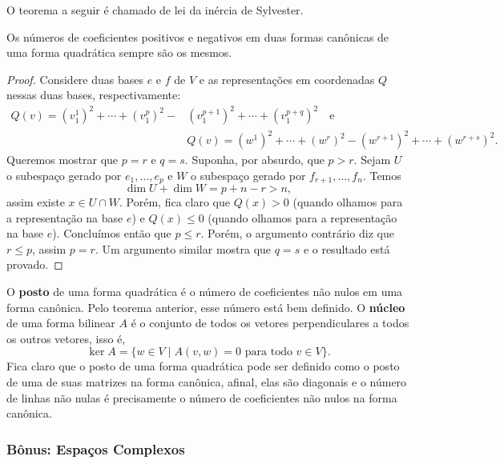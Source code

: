 O teorema a seguir é chamado de lei da inércia de Sylvester.

\begin{theorem}
    Os números de coeficientes positivos e negativos em duas formas canônicas de uma forma quadrática sempre são os mesmos.
\end{theorem}
\begin{proof}
    Considere duas bases $e$ e $f$ de $V$ e as representações em coordenadas $Q$ nessas duas bases, respectivamente: \begin{equation}
        \begin{split}
            Q(v) = (v^1_1)^2 + \cdots + (v^p_1)^2 - &(v^{p+1}_1)^2 + \cdots + (v^{p + q}_1)^2 \quad \text{e} \\ &Q(v) = (w^1)^2 + \cdots + (w^r)^2 - (w^{r+1})^2 + \cdots + (w^{r + s})^2.
        \end{split}
    \end{equation} Queremos mostrar que $p = r$ e $q = s$. Suponha, por absurdo, que $p > r$. Sejam $U$ o subespaço gerado por $e_1, \dots, e_p$ e $W$ o subespaço gerado por $f_{r + 1}, \dots, f_n$. Temos \begin{equation}
        \dim U + \dim W = p + n - r > n,
    \end{equation} assim existe $x \in U \cap W$. Porém, fica claro que $Q(x) > 0$ (quando olhamos para a representação na base $e$) e $Q(x) \leq 0$ (quando olhamos para a representação na base $e$). Concluímos então que $p \leq r$. Porém, o argumento contrário diz que $r \leq p$, assim $p = r$. Um argumento similar mostra que $q = s$ e o resultado está provado.
\end{proof}

O \textbf{posto} de uma forma quadrática é o número de coeficientes não nulos em uma forma canônica. Pelo teorema anterior, esse número está bem definido. O \textbf{núcleo} de uma forma bilinear $A$ é o conjunto de todos os vetores perpendiculares a todos os outros vetores, isso é, \begin{equation}
    \ker A = \{w \in V \mid A(v,w) = 0 \text{ para todo } v \in V\}.
\end{equation}
Fica claro que o posto de uma forma quadrática pode ser definido como o posto de uma de suas matrizes na forma canônica, afinal, elas são diagonais e o número de linhas não nulas é precisamente o número de coeficientes não nulos na forma canônica.

\subsubsection*{Bônus: Espaços Complexos}

